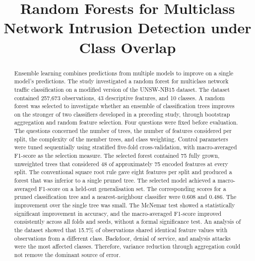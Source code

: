 \documentclass[conference]{IEEEtran}
\begin{document}
\title{Random Forests for Multiclass Network Intrusion Detection under Class Overlap}

\author{
}

\maketitle

\begin{abstract}
Ensemble learning combines predictions from multiple models to improve on a single model's predictions. The study investigated a random forest for multiclass network traffic classification on a modified version of the UNSW-NB15 dataset. The dataset contained 257,673 observations, 43 descriptive features, and 10 classes. A random forest was selected to investigate whether an ensemble of classification trees improves on the stronger of two classifiers developed in a preceding study, through bootstrap aggregation and random feature selection. Four questions were fixed before evaluation. The questions concerned the number of trees, the number of features considered per split, the complexity of the member trees, and class weighting. Control parameters were tuned sequentially using stratified five-fold cross-validation, with macro-averaged F1-score as the selection measure. The selected forest contained 75 fully grown, unweighted trees that considered 48 of approximately 75 encoded features at every split. The conventional square root rule gave eight features per split and produced a forest that was inferior to a single pruned tree. The selected model achieved a macro-averaged F1-score on a held-out generalisation set. The corresponding scores for a pruned classification tree and a nearest-neighbour classifier were 0.608 and 0.486. The improvement over the single tree was small. The McNemar test showed a statistically significant improvement in accuracy, and the macro-averaged F1-score improved consistently across all folds and seeds, without a formal significance test. An analysis of the dataset showed that 15.7\% of observations shared identical feature values with observations from a different class. Backdoor, denial of service, and analysis attacks were the most affected classes. Therefore, variance reduction through aggregation could not remove the dominant source of error.
\end{abstract}
\end{document}
